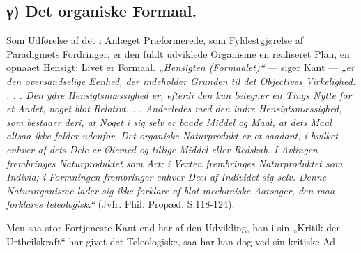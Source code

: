 \documentclass[12pt,a4paper]{book}
\begin{document}
\subsection*{γ) Det organiske Formaal.}

Som Udførelse af det i Anlæget Præformerede, som Fyldestgjørelse af
Paradigmets Fordringer, er den fuldt udviklede Organisme en realiseret
Plan, en opnaaet Hensigt: Livet er Formaal. \emph{„Hensigten
(Formaalet)“} --- siger Kant --- \emph{„er den oversandselige Eenhed, der
indeholder Grunden til det Objectives Virkelighed. . . . Den ydre
Hensigtsmæssighed er, efterdi den kun betegner en Tings Nytte for et
Andet, noget blot Relativt. . . Anderledes med den indre
Hensigtsmæssighed, som bestaaer deri, at Noget i sig selv er baade Middel
og Maal, at dets Maal altsaa ikke falder udenfor. Det organiske
Naturprodukt er et saadant, i hvilket enhver af dets Dele er Øiemed og
tillige Middel eller Redskab. I Avlingen frembringes Naturproduktet som
Art; i Vexten frembringes Naturproduktet som Individ; i Formningen
frembringer enhver Deel af Individet sig selv. Denne Naturorganisme lader
sig ikke forklare af blot mechaniske Aarsager, den maa forklares
teleologisk.“} (Jvfr. Phil. Propæd. S.118-124).

Men saa stor Fortjeneste Kant end har af den Udvikling, han i sin „Kritik
der Urtheilskraft“ har givet det Teleologiske, saa har han dog ved sin
kritiske Ad-
\end{document}
